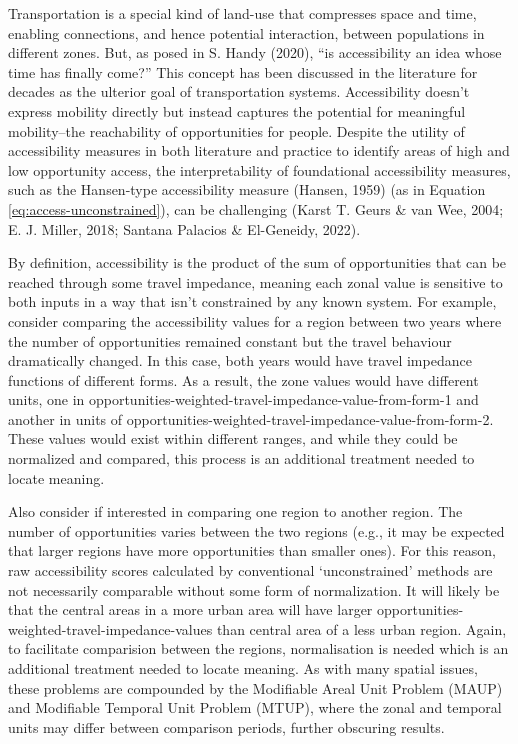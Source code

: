 \documentclass[
11pt, %
oneside, %
english, %
singlespacing, %
]{macthesis} %
\begin{document}
Transportation is a special kind of land-use that compresses space and time, enabling connections, and hence potential interaction, between populations in different zones. But, as posed in S. Handy (2020), ``is accessibility an idea whose time has finally come?'' This concept has been discussed in the literature for decades as the ulterior goal of transportation systems. Accessibility doesn't express mobility directly but instead captures the potential for meaningful mobility--the reachability of opportunities for people. Despite the utility of accessibility measures in both literature and practice to identify areas of high and low opportunity access, the interpretability of foundational accessibility measures, such as the Hansen-type accessibility measure (Hansen, 1959) (as in Equation \ref{eq:access-unconstrained}), can be challenging (Karst T. Geurs \& van Wee, 2004; E. J. Miller, 2018; Santana Palacios \& El-Geneidy, 2022).

By definition, accessibility is the product of the sum of opportunities that can be reached through some travel impedance, meaning each zonal value is sensitive to both inputs in a way that isn't constrained by any known system. For example, consider comparing the accessibility values for a region between two years where the number of opportunities remained constant but the travel behaviour dramatically changed. In this case, both years would have travel impedance functions of different forms. As a result, the zone values would have different units, one in opportunities-weighted-travel-impedance-value-from-form-1 and another in units of opportunities-weighted-travel-impedance-value-from-form-2. These values would exist within different ranges, and while they could be normalized and compared, this process is an additional treatment needed to locate meaning.

Also consider if interested in comparing one region to another region. The number of opportunities varies between the two regions (e.g., it may be expected that larger regions have more opportunities than smaller ones). For this reason, raw accessibility scores calculated by conventional `unconstrained' methods are not necessarily comparable without some form of normalization. It will likely be that the central areas in a more urban area will have larger opportunities-weighted-travel-impedance-values than central area of a less urban region. Again, to facilitate comparision between the regions, normalisation is needed which is an additional treatment needed to locate meaning. As with many spatial issues, these problems are compounded by the Modifiable Areal Unit Problem (MAUP) and Modifiable Temporal Unit Problem (MTUP), where the zonal and temporal units may differ between comparison periods, further obscuring results.
\end{document}
